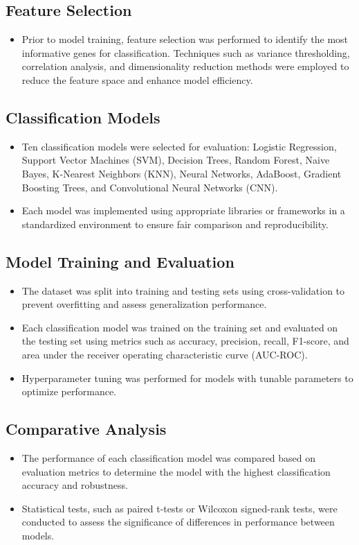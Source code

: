 \documentclass{article}
\begin{document}
\subsection{Feature Selection}
\begin{itemize}
   \item Prior to model training, feature selection was performed to identify the most informative genes for classification. Techniques such as variance thresholding, correlation analysis, and dimensionality reduction methods were employed to reduce the feature space and enhance model efficiency.
\end{itemize}

\subsection{Classification Models}
\begin{itemize}
   \item Ten classification models were selected for evaluation: Logistic Regression, Support Vector Machines (SVM), Decision Trees, Random Forest, Naive Bayes, K-Nearest Neighbors (KNN), Neural Networks, AdaBoost, Gradient Boosting Trees, and Convolutional Neural Networks (CNN).
   \item Each model was implemented using appropriate libraries or frameworks in a standardized environment to ensure fair comparison and reproducibility.
\end{itemize}

\subsection{Model Training and Evaluation}
\begin{itemize}
   \item The dataset was split into training and testing sets using cross-validation to prevent overfitting and assess generalization performance.
   \item Each classification model was trained on the training set and evaluated on the testing set using metrics such as accuracy, precision, recall, F1-score, and area under the receiver operating characteristic curve (AUC-ROC).
   \item Hyperparameter tuning was performed for models with tunable parameters to optimize performance.
\end{itemize}

\subsection{Comparative Analysis}
\begin{itemize}
   \item The performance of each classification model was compared based on evaluation metrics to determine the model with the highest classification accuracy and robustness.
   \item Statistical tests, such as paired t-tests or Wilcoxon signed-rank tests, were conducted to assess the significance of differences in performance between models.
\end{itemize}
\end{document}
